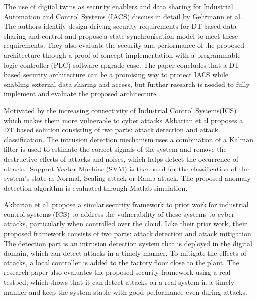 The use of digital twins as security enablers and data sharing for Industrial Automation and Control Systems (IACS) discuss in detail by Gehrmann et al.\cite{gehrmannDigitalTwinBased2020}. The authors identify design-driving security requirements for DT-based data sharing and control and propose a state synchronisation model to meet these requirements. They also evaluate the security and performance of the proposed architecture through a proof-of-concept implementation with a programmable logic controller (PLC) software upgrade case. The paper concludes that a DT-based security architecture can be a promising way to protect IACS while enabling external data sharing and access, but further research is needed to fully implement and evaluate the proposed architecture.

Motivated by the increasing connectivity of Industrial Control Systems(ICS) which makes them more vulnerable to cyber attacks Akbarian et al\cite{akbarianIntrusionDetectionDigital2020} proposes a DT based solution consisting of two parts: attack detection and attack classification. The intrusion detection mechanism uses a combination of a Kalman filter is used  to estimate the correct signals of the system and remove the destructive effects of attacks and noises, which helps detect the occurrence of attacks. Support Vector Machine (SVM) is then used for the classification of the system's state as Normal, Scaling attack or Ramp attack. The proposed anomaly detection algorithm is evaluated through Matlab simulation.

Akbarian et al.\cite{akbarianSecurityFrameworkDigital2021} propose a similar security framework to prior work\cite{akbarianIntrusionDetectionDigital2020} for industrial control systems (ICS) to address the vulnerability of these systems to cyber attacks, particularly when controlled over the cloud. Like their prior work, their proposed framework consists of two parts: attack detection and attack mitigation. The detection part is an intrusion detection system that is deployed in the digital domain, which can detect attacks in a timely manner. To mitigate the effects of attacks, a local controller is added to the factory floor close to the plant. The research paper also evaluates the proposed security framework using a real testbed, which shows that it can detect attacks on a real system in a timely manner and keep the system stable with good performance even during attacks.


